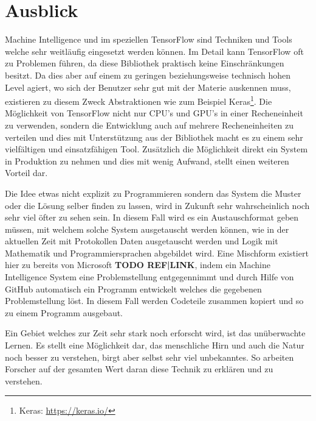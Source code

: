 
\section{Ausblick}

\noindent
Machine Intelligence und im speziellen TensorFlow sind Techniken und Tools welche sehr weitläufig eingesetzt werden können. 
Im Detail kann TensorFlow oft zu Problemen führen, da diese Bibliothek praktisch keine Einschränkungen besitzt. 
Da dies aber auf einem zu geringen beziehungsweise technisch hohen Level agiert, wo sich der Benutzer sehr gut mit der Materie auskennen muss, existieren zu diesem Zweck Abstraktionen wie zum Beispiel Keras\footnote{Keras: \url{https://keras.io/}}. 
Die Möglichkeit von TensorFlow nicht nur CPU's und GPU's in einer Recheneinheit zu verwenden, sondern die Entwicklung auch auf mehrere Recheneinheiten zu verteilen und dies mit Unterstützung aus der Bibliothek macht es zu einem sehr vielfältigen und einsatzfähigen Tool. 
Zusätzlich die Möglichkeit direkt ein System in Produktion zu nehmen und dies mit wenig Aufwand, stellt einen weiteren Vorteil dar. \newline

\noindent
Die Idee etwas nicht explizit zu Programmieren sondern das System die Muster oder die Lösung selber finden zu lassen, wird in Zukunft sehr wahrscheinlich noch sehr viel öfter zu sehen sein. 
In diesem Fall wird es ein Austauschformat geben müssen, mit welchem solche System ausgetauscht werden können, wie in der aktuellen Zeit mit Protokollen Daten ausgetauscht werden und Logik mit Mathematik und Programmiersprachen abgebildet wird. 
Eine Mischform existiert hier zu bereits von Microsoft \textbf{TODO REF|LINK}, indem ein Machine Intelligence System eine Problemstellung entgegennimmt und durch Hilfe von GitHub automatisch ein Programm entwickelt welches die gegebenen Problemstellung löst. 
In diesem Fall werden Codeteile zusammen kopiert und so zu einem Programm ausgebaut. \newline

\noindent
Ein Gebiet welches zur Zeit sehr stark noch erforscht wird, ist das unüberwachte Lernen. 
Es stellt eine Möglichkeit dar, das menschliche Hirn und auch die Natur noch besser zu verstehen, birgt aber selbst sehr viel unbekanntes. 
So arbeiten Forscher auf der gesamten Wert daran diese Technik zu erklären und zu verstehen. 








